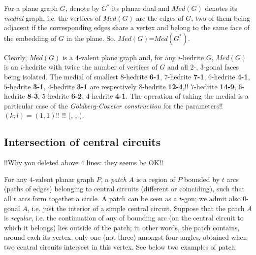 \documentclass[12pt]{article}
\begin{document}
For a plane graph $G$, denote by $G^*$ its planar dual and {\em $Med(G)$} 
denotes its {\em medial} graph, i.e. the vertices of $Med(G)$ are the edges of 
$G$, two of them being adjacent if the corresponding edges share a vertex and 
belong to the same face of the embedding of $G$ in the plane. 
So, $Med(G)$=$Med(G^*)$.

Clearly, $Med(G)$ is a $4$-valent plane graph and, for any $i$-hedrite $G$,
$Med(G)$ is an $i$-hedrite with twice the number of vertices of $G$ and
all $2$-, $3$-gonal faces being isolated. The medial of smallest
$8$-hedrite {\bf 6-1}, $7$-hedrite {\bf 7-1}, $6$-hedrite {\bf 4-1},
$5$-hedrite {\bf 3-1}, $4$-hedrite {\bf 3-1} are respectively $8$-hedrite
{\bf 12-4},!! $7$-hedrite {\bf 14-9}, $6$-hedrite {\bf 8-3},
$5$-hedrite {\bf 6-2}, $4$-hedrite {\bf 4-1}.
The operation of taking the medial is a particular case of the {\em Goldberg-Coxeter construction} for the parameters!! $(k,l)=(1,1)$!! 
!!%
(\cite{Gold37}, \cite{Cox71}, \cite{DD03}).





\subsection{Intersection of central circuits}

!!Why you deleted above 4 lines: they seems be OK!!

For any $4$-valent planar graph $P$, a {\em patch} $A$ is a region of $P$
bounded by $t$ arcs (paths of edges) belonging to central circuits 
(different or coinciding), such that all $t$ arcs form together a circle. 
A patch can be seen as a $t$-gon; we admit also 
$0$-gonal $A$, i.e. just the interior of a simple central circuit. 
Suppose that the patch $A$ is {\em regular}, i.e.
the continuation of any of bounding arc (on the central circuit to which it
belongs) lies outside of the patch; in other words, the patch
contains, around each its vertex, only one (not three) amongst four angles, 
obtained when two central circuits intersect in this vertex.  See below two 
examples of patch.

\begin{center}
\epsfxsize=60mm
\end{center}
\end{document}
